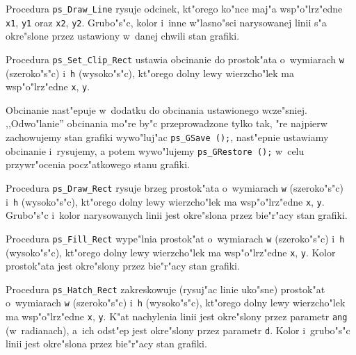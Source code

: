 \vspace{\bigskipamount}
Procedura \texttt{ps\_Draw\_Line} rysuje odcinek, kt"orego ko"nce maj"a
wsp"o"lrz"edne \texttt{x1}, \texttt{y1} oraz \texttt{x2}, \texttt{y2}.
Grubo"s"c, kolor i~inne w"lasno"sci narysowanej linii s"a okre"slone przez
ustawiony w~danej chwili stan grafiki.

\vspace{\bigskipamount}
Procedura \texttt{ps\_Set\_Clip\_Rect} ustawia obcinanie do prostok"ata
o~wymiarach \texttt{w} (szeroko"s"c) i~\texttt{h} (wysoko"s"c), kt"orego
dolny lewy wierzcho"lek ma wsp"o"lrz"edne \texttt{x}, \texttt{y}.

Obcinanie nast"epuje w~dodatku do obcinania ustawionego wcze"sniej.
,,Odwo"lanie'' obcinania mo"re by"c przeprowadzone tylko tak, "re najpierw
zachowujemy stan grafiki wywo"luj"ac \texttt{ps\_GSave~();},
nast"epnie ustawiamy obcinanie i~rysujemy, a potem wywo"lujemy
\texttt{ps\_GRestore~();} w~celu przywr"ocenia pocz"atkowego stanu grafiki.

\vspace{\bigskipamount}
Procedura \texttt{ps\_Draw\_Rect} rysuje brzeg prostok"ata o~wymiarach
\texttt{w} (szeroko"s"c) i~\texttt{h} (wysoko"s"c), kt"orego dolny lewy
wierzcho"lek ma wsp"o"lrz"edne \texttt{x}, \texttt{y}. Grubo"s"c i~kolor
narysowanych linii jest okre"slona przez bie"r"acy stan grafiki.

\vspace{\bigskipamount}
Procedura \texttt{ps\_Fill\_Rect} wype"lnia prostok"at o~wymiarach
\texttt{w} (szeroko"s"c) i~\texttt{h} (wysoko"s"c), kt"orego dolny lewy
wierzcho"lek ma wsp"o"lrz"edne \texttt{x}, \texttt{y}. Kolor
prostok"ata jest okre"slony przez bie"r"acy stan grafiki.

\vspace{\bigskipamount}
Procedura \texttt{ps\_Hatch\_Rect} zakreskowuje (rysuj"ac linie uko"sne)
prostok"at o~wymiarach
\texttt{w} (szeroko"s"c) i~\texttt{h} (wysoko"s"c), kt"orego dolny lewy
wierzcho"lek ma wsp"o"lrz"edne \texttt{x}, \texttt{y}. K"at nachylenia linii
jest okre"slony przez parametr \texttt{ang} (w~radianach), a~ich odst"ep
jest okre"slony przez parametr \texttt{d}. Kolor i~grubo"s"c linii
jest okre"slona przez bie"r"acy stan grafiki.

